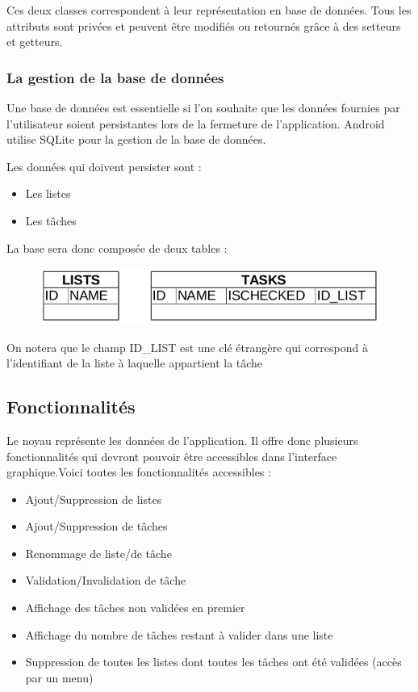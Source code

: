 \documentclass[a4paper, 11pt, french]{report}
\begin{document}
Ces deux classes correspondent à leur représentation en base de données.
Tous les attributs sont privées et peuvent être modifiés ou retournés grâce à des setteurs et getteurs.
	
\subsubsection{La gestion de la base de données}

Une base de données est essentielle si l'on souhaite que les données fournies par l'utilisateur soient persistantes lors de la fermeture de l'application.
Android utilise SQLite pour la gestion de la base de données.

Les données qui doivent persister sont : 
\begin{itemize}
	\item Les listes
	\item Les tâches
\end{itemize}

La base sera donc composée de deux tables :
	\begin{figure}[!h]
		\centering
		\includegraphics[scale=0.5]{Tables.png}
		\label{Tables SQL}
	\end{figure}

On notera que le champ ID\_LIST est une clé étrangère qui correspond à l'identifiant de la liste à laquelle appartient la tâche

\subsection{Fonctionnalités}
Le noyau représente les données de l'application. Il offre donc plusieurs fonctionnalités qui devront pouvoir être accessibles dans l'interface graphique.Voici toutes les fonctionnalités accessibles :
	\begin{itemize}
		\item Ajout/Suppression de listes
		\item Ajout/Suppression de tâches
		\item Renommage de liste/de tâche
		\item Validation/Invalidation de tâche
		\item Affichage des tâches non validées en premier
		\item Affichage du nombre de tâches restant à valider dans une liste
		\item Suppression de toutes les listes dont toutes les tâches ont été validées (accès par un menu)
	\end{itemize}
\end{document}
